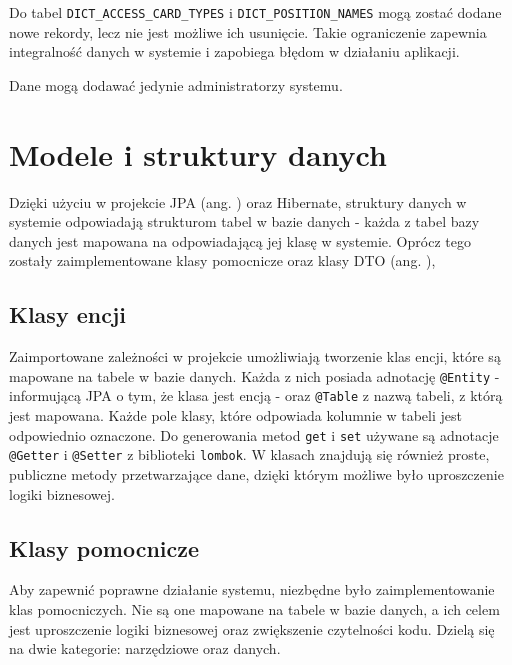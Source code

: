 Do tabel \texttt{DICT\_ACCESS\_CARD\_TYPES} i \texttt{DICT\_POSITION\_NAMES} mogą zostać dodane nowe rekordy, lecz nie jest możliwe ich usunięcie. Takie ograniczenie zapewnia integralność danych w systemie i zapobiega błędom w działaniu aplikacji.

Dane mogą dodawać jedynie administratorzy systemu.

\section{Modele i struktury danych}


Dzięki użyciu w projekcie JPA (ang. ) oraz Hibernate, struktury danych w systemie odpowiadają strukturom tabel w bazie danych - każda z tabel bazy danych jest mapowana na odpowiadającą jej klasę w systemie. Oprócz tego zostały zaimplementowane klasy pomocnicze oraz klasy DTO (ang. ),

\subsection{Klasy encji}

Zaimportowane zależności w projekcie umożliwiają tworzenie klas encji, które są mapowane na tabele w bazie danych. Każda z nich posiada adnotację \texttt{@Entity} - informującą JPA o tym, że klasa jest encją - oraz \texttt{@Table} z nazwą tabeli, z którą jest mapowana. Każde pole klasy, które odpowiada kolumnie w tabeli jest odpowiednio oznaczone. Do generowania metod \texttt{get} i \texttt{set} używane są adnotacje \texttt{@Getter} i \texttt{@Setter} z biblioteki \texttt{lombok}. W klasach znajdują się również proste, publiczne metody przetwarzające dane, dzięki którym możliwe było uproszczenie logiki biznesowej.

\subsection{Klasy pomocnicze}

Aby zapewnić poprawne działanie systemu, niezbędne było zaimplementowanie klas pomocniczych. Nie są one mapowane na tabele w bazie danych, a ich celem jest uproszczenie logiki biznesowej oraz zwiększenie czytelności kodu. Dzielą się na dwie kategorie: narzędziowe oraz danych.

